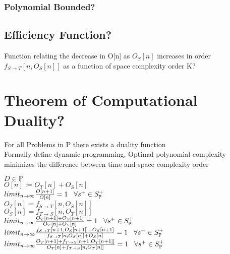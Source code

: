 \documentclass[11pt]{article}
\begin{document}
\subsubsection{Polynomial Bounded?}




\subsection{Efficiency Function?}
Function relating the decrease in O[n] as $O_S[n]$ increases in order\\
$f_{S \rightarrow T}[n,O_S[n]]$ as a function of space complexity order K?


\section{Theorem of Computational Duality?}
For all Problems in P there exists a duality function\\
Formally define dynamic programming, Optimal polynomial complexity minimizes the difference between time and space complexity order
\begin{center}
\vspace{2mm}
$
D \in \mathbb{P}
$
\\ \vspace{2mm}
$
O[n] := O_T[n] + O_S[n]
$
\\ \vspace{2mm}
$
limit_{n \rightarrow \infty} \frac{O[n+1]}{O[n]} = 1 \hspace{3mm} \forall s^+ \in S_{\mathbb{P}}^+
$
\\ \vspace{7mm}
$
O_T[n] = f_{S \rightarrow T}[n,O_S[n]]
$
\\ \vspace{2mm}
$
O_S[n] = f_{T \rightarrow S}[n,O_T[n]]
$
\\ \vspace{7mm}
$
limit_{n \rightarrow \infty} \frac{O_T[n+1] + O_S[n+1]}{O_T[n] + O_S[n]} = 1 \hspace{3mm} \forall s^+ \in S_{\mathbb{P}}^+
$
\\ \vspace{7mm}
$
limit_{n \rightarrow \infty} \frac{ f_{S \rightarrow T}[n+1,O_S[n+1]] + O_S[n+1]}{ f_{S \rightarrow T}[n,O_S[n]] + O_S[n]} = 1 \hspace{3mm} \forall s^+ \in S_{\mathbb{P}}^+
$
\\ \vspace{3mm}
$
limit_{n \rightarrow \infty} \frac{O_T[n+1] + f_{T \rightarrow S}[n+1,O_T[n+1]]}{O_T[n] + f_{T \rightarrow S}[n,O_T[n]]} = 1 \hspace{3mm} \forall s^+ \in S_{\mathbb{P}}^+
$
\end{center}
\end{document}
